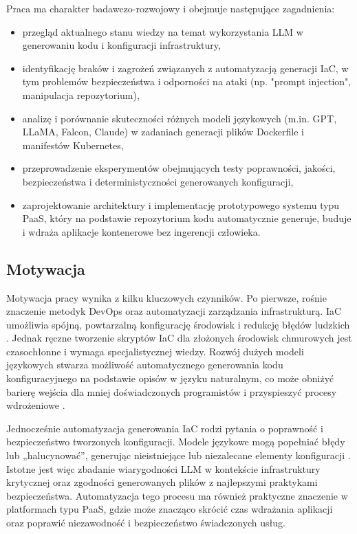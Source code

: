 Praca ma charakter badawczo-rozwojowy i obejmuje następujące zagadnienia:
\begin{itemize}
\item przegląd aktualnego stanu wiedzy na temat wykorzystania LLM w generowaniu kodu i konfiguracji infrastruktury,
\item identyfikację braków i zagrożeń związanych z automatyzacją generacji IaC, w tym problemów bezpieczeństwa i odporności na ataki (np. "prompt injection", manipulacja repozytorium),
\item analizę i porównanie skuteczności różnych modeli językowych (m.in. GPT, LLaMA, Falcon, Claude) w zadaniach generacji plików Dockerfile i manifestów Kubernetes,
\item przeprowadzenie eksperymentów obejmujących testy poprawności, jakości, bezpieczeństwa i deterministyczności generowanych konfiguracji,
\item zaprojektowanie architektury i implementację prototypowego systemu typu PaaS, który na podstawie repozytorium kodu automatycznie generuje, buduje i wdraża aplikacje kontenerowe bez ingerencji człowieka.
\end{itemize}

\subsection{Motywacja}

Motywacja pracy wynika z kilku kluczowych czynników. Po pierwsze, rośnie znaczenie metodyk DevOps oraz automatyzacji zarządzania infrastrukturą. IaC umożliwia spójną, powtarzalną konfigurację środowisk i redukcję błędów ludzkich \cite{low_repairing_2024}. Jednak ręczne tworzenie skryptów IaC dla złożonych środowisk chmurowych jest czasochłonne i wymaga specjalistycznej wiedzy. Rozwój dużych modeli językowych stwarza możliwość automatycznego generowania kodu konfiguracyjnego na podstawie opisów w języku naturalnym, co może obniżyć barierę wejścia dla mniej doświadczonych programistów i przyspieszyć procesy wdrożeniowe \cite{hu_llm-based_2025}.

Jednocześnie automatyzacja generowania IaC rodzi pytania o poprawność i bezpieczeństwo tworzonych konfiguracji. Modele językowe mogą popełniać błędy lub „halucynować”, generując nieistniejące lub niezalecane elementy konfiguracji \cite{malul_genkubesec_2024}. Istotne jest więc zbadanie wiarygodności LLM w kontekście infrastruktury krytycznej oraz zgodności generowanych plików z najlepszymi praktykami bezpieczeństwa. Automatyzacja tego procesu ma również praktyczne znaczenie w platformach typu PaaS, gdzie może znacząco skrócić czas wdrażania aplikacji oraz poprawić niezawodność i bezpieczeństwo świadczonych usług.

